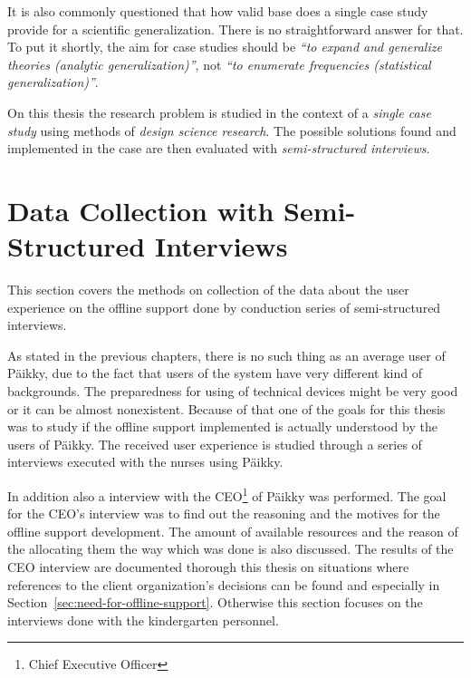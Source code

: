 It is also commonly questioned that how valid base does a single case study provide for a scientific generalization. There is no straightforward answer for that. To put it shortly, the aim for case studies should be \textit{``to expand and generalize theories (analytic generalization)''}, not \textit{``to enumerate frequencies (statistical generalization)''}. \cite[Page 15]{yin_case_2013}

On this thesis the research problem is studied in the context of a \textit{single case study} using methods of \textit{design science research}. The possible solutions found and implemented in the case are then evaluated with \textit{semi-structured interviews}.











\section{Data Collection with Semi-Structured Interviews}

This section covers the methods on collection of the data about the user experience on the offline support done by conduction series of semi-structured interviews.

As stated in the previous chapters, there is no such thing as an average user of Päikky, due to the fact that users of the system have very different kind of backgrounds. The preparedness for using of technical devices might be very good or it can be almost nonexistent. Because of that one of the goals for this thesis was to study if the offline support implemented is actually understood by the users of Päikky. The received user experience is studied through a series of interviews executed with the nurses using Päikky.

In addition also a interview with the CEO\footnote{Chief Executive Officer} of Päikky was performed. The goal for the CEO's interview was to find out the reasoning and the motives for the offline support development. The amount of available resources and the reason of the allocating them the way which was done is also discussed. The results of the CEO interview are documented thorough this thesis on situations where references to the client organization's decisions can be found and especially in Section~\ref{sec:need-for-offline-support}. Otherwise this section focuses on the interviews done with the kindergarten personnel.

